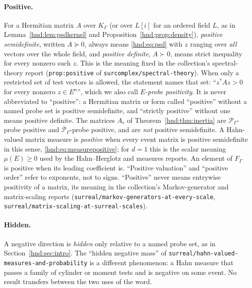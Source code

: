 \documentclass[11pt,oneside]{article}
\theoremstyle{definition}
\theoremstyle{remark}
\newcommand{\Pfield}{\mathscr P_\Gamma}
\newcommand{\repo}[1]{\nolinkurl{#1}}%
\newcommand{\lbl}[1]{\nolinkurl{#1}}%
\begin{document}
\paragraph{Positive.} For a Hermitian matrix $A$ over $K_\Gamma$ (or over
$L[i]$ for an ordered field $L$, as in Lemma~\ref{hnd:lem:psdkernel} and
Proposition~\ref{hnd:prop:density}), \emph{positive semidefinite}, written
$A\succeq0$, always means \eqref{hnd:eq:psd} with $z$ ranging over
\emph{all} vectors over the whole field, and \emph{positive definite},
$A\succ0$, means strict inequality for every nonzero such $z$. This is the
meaning fixed in the collection's spectral-theory report
(\lbl{prop:positive} of \repo{surcomplex/spectral-theory}). When only a
restricted set of test vectors is allowed, the statement names that set:
``$z^*Az>0$ for every nonzero $z\in E^n$'', which we also call
\emph{$E$-probe positivity}. It is never abbreviated to ``positive'':
a Hermitian matrix or form called ``positive'' without a named probe set
is positive semidefinite, and ``strictly positive'' without one means
positive definite. The
matrices $A_r$ of Theorem~\ref{hnd:thm:inertia} are
$\Pfield$-probe positive and $\overline{\mathscr P}_\Gamma$-probe positive, and
are \emph{not} positive semidefinite. A Hahn-valued matrix measure is
\emph{positive} when every event matrix is positive semidefinite in this
sense, \eqref{hnd:eq:measurepositive}; for $d=1$ this is the scalar
meaning $\mu(E)\ge0$ used by the Hahn--Herglotz and measures reports.
An element of $F_\Gamma$ is positive when its leading coefficient is.
``Positive valuation'' and ``positive order'' refer to exponents, not to
signs. ``Positive'' never means entrywise positivity of a matrix, its
meaning in the collection's Markov-generator and matrix-scaling reports
(\repo{surreal/markov-generators-at-every-scale},
\repo{surreal/matrix-scaling-at-surreal-scales}).

\paragraph{Hidden.} A negative direction is \emph{hidden} only relative to
a named probe set, as in Section~\ref{hnd:sec:intro}. The ``hidden negative
mass'' of \repo{surreal/hahn-valued-measures-and-probability} is a
different phenomenon: a Hahn measure that passes a family of cylinder or
moment tests and is negative on some event. No result transfers between
the two uses of the word.
\end{document}
